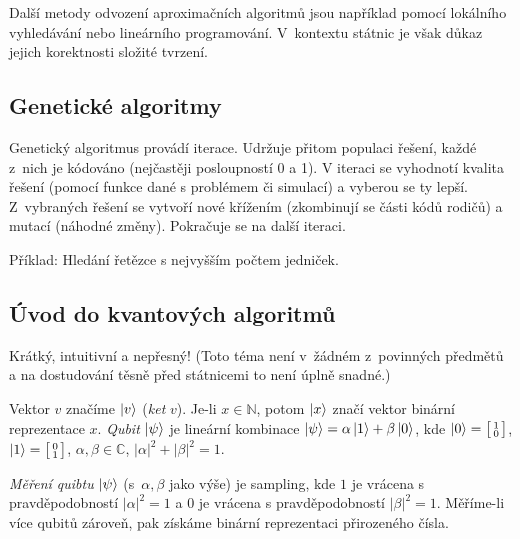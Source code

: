 Další metody odvození aproximačních algoritmů jsou například pomocí
lokálního vyhledávání nebo lineárního programování.
V~kontextu státnic je však důkaz jejich korektnosti složité tvrzení.

\subsection{Genetické algoritmy}

Genetický algoritmus provádí iterace. Udržuje přitom populaci řešení,
každé z~nich je kódováno (nejčastěji posloupností 0 a 1). V iteraci se
vyhodnotí kvalita řešení (pomocí funkce dané s problémem či simulací)
a vyberou se ty lepší. Z~vybraných řešení se vytvoří nové křížením
(zkombinují se části kódů rodičů) a mutací (náhodné změny). Pokračuje se
na další iteraci.

Příklad: Hledání řetězce s nejvyšším počtem jedniček.

\subsection{Úvod do kvantových algoritmů}


Krátký, intuitivní a nepřesný! (Toto téma není v~žádném z~povinných
předmětů a na dostudování těsně před státnicemi to není úplně snadné.)

Vektor $v$ značíme $\ket{v}$ ({\em ket}
$v$). Je-li $x \in \mathbb{N}$, potom $\ket{x}$ značí vektor binární
reprezentace $x$. {\em Qubit} $\ket{\psi}$ je lineární kombinace
$\ket{\psi} = \alpha \ket{1} + \beta \ket{0}$, kde $\ket{0} =
\bigl[\begin{smallmatrix}
1\\
0
\end{smallmatrix}\bigr]$, $\ket{1} = \bigl[\begin{smallmatrix}
0\\
1
\end{smallmatrix}\bigr]$, $\alpha, \beta \in \mathbb{C}$,
$\lvert \alpha \rvert^2 + \lvert \beta \rvert^2 = 1$.

{\em Měření quibtu} $\ket{\psi}$ (s~$\alpha, \beta$ jako výše) je sampling,
kde $1$ je vrácena s pravděpodobností
$\lvert \alpha \rvert^2 = 1$
a $0$ je vrácena s pravděpodobností
$\lvert \beta \rvert^2 = 1$. Měříme-li více qubitů zároveň, pak získáme
binární reprezentaci přirozeného čísla.

